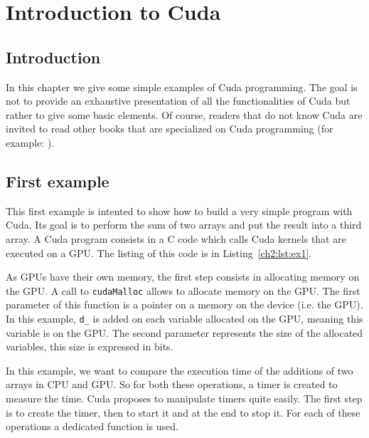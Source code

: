 
\chapter{Introduction to Cuda}
\label{chapter2}

\section{Introduction}
\label{ch2:intro}

In this chapter  we give some simple examples of Cuda  programming.  The goal is
not to provide an exhaustive presentation of all the functionalities of Cuda but
rather to give some basic elements. Of  course, readers that do not know Cuda are
invited  to read  other  books that  are  specialized on  Cuda programming  (for
example: \cite{ch2:Sanders:2010:CEI}).


\section{First example}
\label{ch2:1ex}

This first example is  intented to show how to build a  very simple program with
Cuda.  Its goal  is to perform the sum  of two arrays and put the  result into a
third array.  A Cuda program consists in  a C code which calls Cuda kernels that
are executed on a GPU. The listing of this code is in Listing~\ref{ch2:lst:ex1}.


As GPUs have  their own memory, the first step consists  in allocating memory on
the GPU.  A call to  \texttt{cudaMalloc} allows
to allocate memory on the GPU. The first parameter of this function is a pointer
on a memory on the device (i.e. the GPU). In this example, \texttt{d\_} is added
on each variable allocated  on the GPU, meaning this variable is  on the GPU. The
second parameter represents the size of the allocated variables, this size is expressed in
bits.

In this example, we  want to compare the execution time of  the additions of two
arrays in  CPU and  GPU. So  for both these  operations, a  timer is  created to
measure the  time. Cuda proposes to  manipulate timers quite  easily.  The first
step is to create the timer, then to start it and at
the end to stop it. For each of these operations a dedicated function is used.

